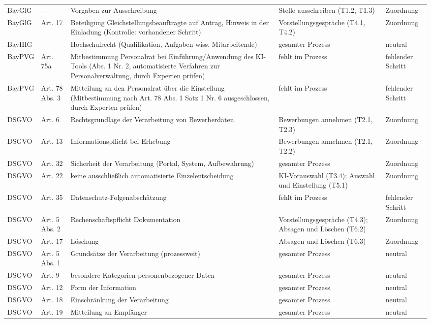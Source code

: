 \begin{small}
\begin{longtable}{@{}>{\raggedright\arraybackslash}p{1.9cm}>{\raggedright\arraybackslash}p{2.0cm}>{\raggedright\arraybackslash}p{5.0cm}>{\raggedright\arraybackslash}p{4.0cm}>{\raggedright\arraybackslash}p{1.8cm}@{}}
BayGlG & -- & Vorgaben zur Ausschreibung & Stelle ausschreiben (T1.2, T1.3) & Zuordnung \\
BayGlG & Art. 17 & Beteiligung Gleichstellungsbeauftragte auf Antrag, Hinweis in der Einladung (Kontrolle: vorhandener Schritt) & Vorstellungsgespräche (T4.1, T4.2) & Zuordnung \\
BayHIG & -- & Hochschulrecht (Qualifikation, Aufgaben wiss. Mitarbeitende) & gesamter Prozess & neutral \\
BayPVG & Art. 75a & Mitbestimmung Personalrat bei Einführung/Anwendung des KI-Tools (Abs. 1 Nr. 2, automatisierte Verfahren zur Personalverwaltung, durch Experten prüfen) & fehlt im Prozess & fehlender Schritt \\
BayPVG & Art. 78 Abs. 3 & Mitteilung an den Personalrat über die Einstellung (Mitbestimmung nach Art. 78 Abs. 1 Satz 1 Nr. 6 ausgeschlossen, durch Experten prüfen) & fehlt im Prozess & fehlender Schritt \\
DSGVO & Art. 6 & Rechtsgrundlage der Verarbeitung von Bewerberdaten & Bewerbungen annehmen (T2.1, T2.3) & Zuordnung \\
DSGVO & Art. 13 & Informationspflicht bei Erhebung & Bewerbungen annehmen (T2.1, T2.2) & Zuordnung \\
DSGVO & Art. 32 & Sicherheit der Verarbeitung (Portal, System, Aufbewahrung) & gesamter Prozess & Zuordnung \\
DSGVO & Art. 22 & keine ausschließlich automatisierte Einzelentscheidung & KI-Vorauswahl (T3.4); Auswahl und Einstellung (T5.1) & Zuordnung \\
DSGVO & Art. 35 & Datenschutz-Folgenabschätzung & fehlt im Prozess & fehlender Schritt \\
DSGVO & Art. 5 Abs. 2 & Rechenschaftspflicht Dokumentation & Vorstellungsgespräche (T4.3); Absagen und Löschen (T6.2) & Zuordnung \\
DSGVO & Art. 17 & Löschung & Absagen und Löschen (T6.3) & Zuordnung \\
DSGVO & Art. 5 Abs. 1 & Grundsätze der Verarbeitung (prozessweit) & gesamter Prozess & neutral \\
DSGVO & Art. 9 & besondere Kategorien personenbezogener Daten & gesamter Prozess & neutral \\
DSGVO & Art. 12 & Form der Information & gesamter Prozess & neutral \\
DSGVO & Art. 18 & Einschränkung der Verarbeitung & gesamter Prozess & neutral \\
DSGVO & Art. 19 & Mitteilung an Empfänger & gesamter Prozess & neutral \\

\end{longtable}
\end{small}
